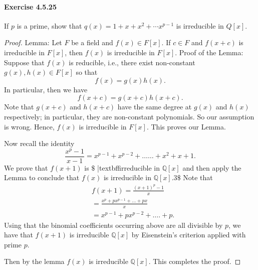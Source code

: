 \documentclass{article}
\begin{document}
\paragraph{Exercise 4.5.25} If $p$ is a prime, show that $q(x) = 1 + x + x^2 + \cdots x^{p - 1}$ is irreducible in $Q[x]$.
\begin{proof}
    Lemma: Let $F$ be a field and $f(x) \in F[x]$. If $c \in F$ and $f(x+c)$ is irreducible in $F[x]$, then $f(x)$ is irreducible in $F[x]$.
Proof of the Lemma: Suppose that $f(x)$ is reducible, i.e., there exist non-constant $g(x), h(x) \in F[x]$ so that
$$
f(x)=g(x) h(x) .
$$
In particular, then we have
$$
f(x+c)=g(x+c) h(x+c) .
$$
Note that $g(x+c)$ and $h(x+c)$ have the same degree at $g(x)$ and $h(x)$ respectively; in particular, they are non-constant polynomials. So our assumption is wrong.
Hence, $f(x)$ is irreducible in $F[x]$. This proves our Lemma.

Now recall the identity
$$
\frac{x^p-1}{x-1}=x^{p-1}+x^{p-2}+\ldots \ldots+x^2+x+1 .
$$
We prove that $f(x+1)$ is $\$$ |textbffirreducible in $\mathbb{Q}[x]$ and then apply the Lemma to conclude that $f(x)$ is irreducible in $\mathbb{Q}[x] .3 \$$ Note that
$$
\begin{aligned}
& f(x+1)=\frac{(x+1)^p-1}{x} \\
& =\frac{x^p+p x^{p-1}+\ldots+p x}{x} \\
& =x^{p-1}+p x^{p-2}+\ldots .+p .
\end{aligned}
$$
Using that the binomial coefficients occurring above are all divisible by $p$, we have that $f(x+1)$ is irreducible $\mathbb{Q}[x]$ by Eisenstein's criterion applied with prime $p$. 

Then by the lemma $f(x)$ is irreducible $\mathbb{Q}[x]$. This completes the proof.
\end{proof}
\end{document}
